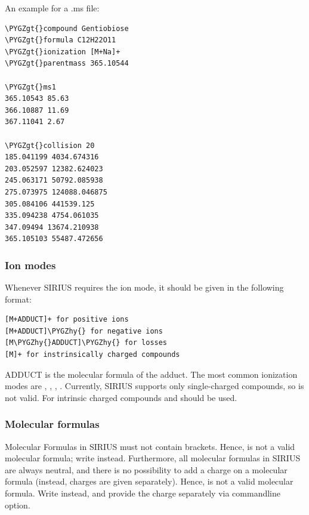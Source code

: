 \documentclass[letterpaper,10pt,openany,oneside]{sphinxmanual}
\def\PYGZgt{\char`\>}
\def\PYGZhy{\char`\-}
\begin{document}
An example for a .ms file:

\begin{Verbatim}[commandchars=\\\{\}]
\PYGZgt{}compound Gentiobiose
\PYGZgt{}formula C12H22O11
\PYGZgt{}ionization [M+Na]+
\PYGZgt{}parentmass 365.10544

\PYGZgt{}ms1
365.10543 85.63
366.10887 11.69
367.11041 2.67

\PYGZgt{}collision 20
185.041199 4034.674316
203.052597 12382.624023
245.063171 50792.085938
275.073975 124088.046875
305.084106 441539.125
335.094238 4754.061035
347.09494 13674.210938
365.105103 55487.472656
\end{Verbatim}


\subsubsection{Ion modes}
\label{commandline:ions}\label{commandline:ion-modes}
Whenever SIRIUS requires the ion mode, it should be given in the following format:

\begin{Verbatim}[commandchars=\\\{\}]
[M+ADDUCT]+ for positive ions
[M+ADDUCT]\PYGZhy{} for negative ions
[M\PYGZhy{}ADDUCT]\PYGZhy{} for losses
[M]+ for instrinsically charged compounds
\end{Verbatim}

ADDUCT is the molecular formula of the adduct. The most common ionization modes are \code{{[}M+H{]}+}, \code{{[}M+Na{]}+}, \code{{[}M-H{]}-}, \code{{[}M+Cl{]}-}. Currently, SIRIUS supports only single-charged compounds, so  is not valid. For intrinsic charged compounds \code{{[}M{]}+} and \code{{[}M{]}-} should be used.


\subsubsection{Molecular formulas}
\label{commandline:molecular-formulas}\label{commandline:formulas}

Molecular Formulas in SIRIUS must not contain brackets.
Hence,  is not a valid molecular formula; write 
instead.  Furthermore, all molecular formulas in SIRIUS are always neutral,
and there is no possibility to add a charge on a molecular formula (instead,
charges are given separately). Hence,  is not a valid molecular
formula.  Write  instead, and provide the charge separately via
commandline option.
\end{document}
